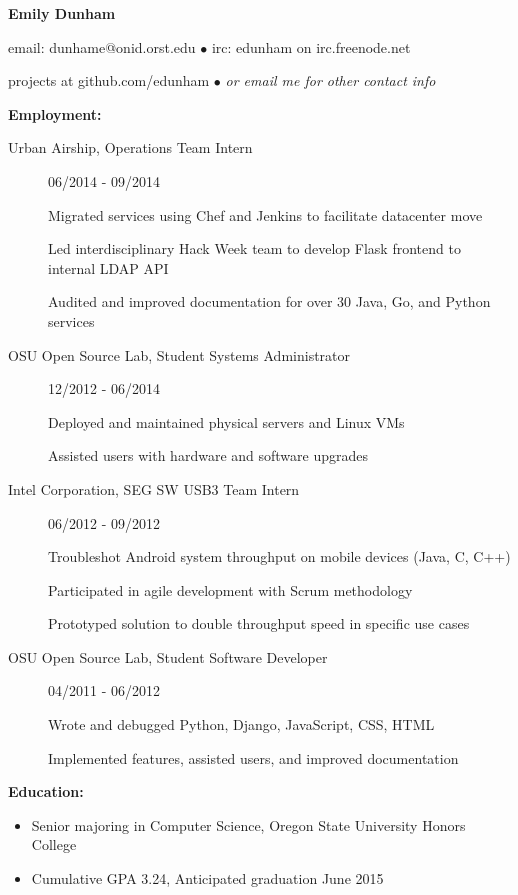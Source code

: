 \documentclass[11pt]{article}
\begin{document}
\centerline{{\LARGE \bf Emily Dunham}}

\bigskip

\centerline{email: dunhame@onid.orst.edu
        $\bullet$
        irc: edunham on irc.freenode.net}
\centerline{projects at github.com/edunham
        $\bullet$
        \emph{or email me for other contact info}}

\bigskip
\hrulefill
\bigskip

{\Large \bf Employment:}
\begin{description}
\item[Urban Airship, Operations Team Intern]
    \hfill 06/2014 - 09/2014
    
    Migrated services using Chef and Jenkins to facilitate datacenter move

    Led interdisciplinary Hack Week team to develop Flask frontend to internal LDAP API

    Audited and improved documentation for over 30 Java, Go, and Python
    services

\item[OSU Open Source Lab, Student Systems Administrator]
    \hfill 12/2012 - 06/2014

    Deployed and maintained physical servers and Linux VMs

    Assisted users with hardware and software upgrades

\item[Intel Corporation, SEG SW USB3 Team Intern]
    \hfill 06/2012 - 09/2012

    Troubleshot Android system throughput on mobile devices (Java, C, C++)

    Participated in agile development with Scrum methodology

    Prototyped solution to double throughput speed in specific use cases

\item[OSU Open Source Lab, Student Software Developer]
    \hfill 04/2011 - 06/2012

    Wrote and debugged Python, Django, JavaScript, CSS, HTML

    Implemented features, assisted users, and improved documentation
\end{description}

\smallskip
\hrulefill
\bigskip

{\Large \bf Education:}
\begin{itemize}
    \setlength{\itemsep}{1pt}
    \setlength{\parskip}{0pt}
    \setlength{\parsep}{0pt}

    \item Senior majoring in Computer Science, Oregon State University
          Honors College
    \item Cumulative GPA 3.24, Anticipated graduation June 2015

\end{itemize}
\end{document}
